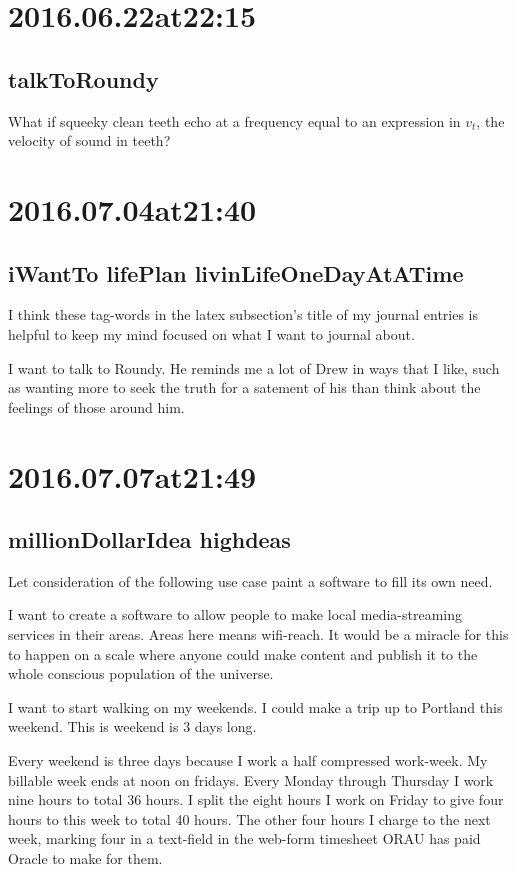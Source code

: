 \begin{enumerate}
\begin{enumerate}
\section*{ 2016.06.22at22:15 }
\subsection*{ talkToRoundy }
What if squeeky clean teeth echo at a frequency equal to an expression in $v_t$, the velocity of sound in teeth?

\section*{ 2016.07.04at21:40 }
\subsection*{ iWantTo lifePlan livinLifeOneDayAtATime }
I think these tag-words in the latex subsection's title of my journal entries is helpful to keep my mind focused on what I want to journal about. 

I want to talk to Roundy. He reminds me a lot of Drew in ways that I like, such as wanting more to seek the truth for a satement of his than think about the feelings of those around him.

\section*{ 2016.07.07at21:49 }
\subsection*{ millionDollarIdea highdeas }
Let consideration of the following use case paint a software to fill its own need.

I want to create a software to allow people to make local media-streaming services in their areas. Areas here means wifi-reach. It would be a miracle for this to happen on a scale where anyone could make content and publish it to the whole conscious population of the universe.\

I want to start walking on my weekends. I could make a trip up to Portland this weekend. This is weekend is 3 days long.

Every weekend is three days because I work a half compressed work-week. My billable week ends at noon on fridays. Every Monday through Thursday I work nine hours to total 36 hours. I split the eight hours I work on Friday to give four hours to this week to total 40 hours. The other four hours I charge to the next week, marking four in a text-field in the web-form timesheet ORAU has paid Oracle to make for them.




\end{enumerate}
\end{enumerate}
